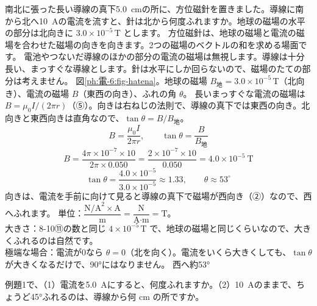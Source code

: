 \label{ph:電-6:ex1}
\begin{phreidai}
南北に張った長い導線の真下\qty{5.0}{cm}の所に、方位磁針を置きました。導線に南から北へ\qty{10}{A}の電流を流すと、針は北から何度ふれますか。地球の磁場の水平の部分は北向きに $3.0\times10^{-5}$\,T とします。
\phbamen
方位磁針は、地球の磁場と電流の磁場を合わせた磁場の向きを向きます。2つの磁場のベクトルの和を求める場面です。
\phmushi
電池やつないだ導線のほかの部分の電流の磁場は無視します。導線は十分長い、まっすぐな導線とします。針は水平にしか回らないので、磁場のたての部分は考えません。
\phzu
図\ref{ph:電-6:fig-hatena}。地球の磁場 $B_{\text{地}}=3.0\times10^{-5}$\,T（北向き）、電流の磁場 $B$（東西の向き）、ふれの角 $\theta$。
\phriyu
長いまっすぐな電流の磁場は $B=\mu_0I/(2\pi r)$（⑤）。向きは右ねじの法則で、導線の真下では東西の向き。北向きと東西向きは直角なので、$\tan\theta=B/B_{\text{地}}$。
\phtateru
\[B=\frac{\mu_0I}{2\pi r},\qquad\tan\theta=\frac{B}{B_{\text{地}}}\]
\phtoku
\[B=\frac{4\pi\times10^{-7}\times10}{2\pi\times0.050}=\frac{2\times10^{-7}\times10}{0.050}=4.0\times10^{-5}\ \text{T}\]
\[\tan\theta=\frac{4.0\times10^{-5}}{3.0\times10^{-5}}\approx1.33,\qquad\theta\approx53^\circ\]
向きは、電流を手前に向けて見ると導線の真下で磁場が西向き（②）なので、西へふれます。
\phtashikame
単位：$\dfrac{\text{N/A}^2\times\text{A}}{\text{m}}=\dfrac{\text{N}}{\text{A·m}}=\text{T}$。\\
大きさ：8-10⑪の数と同じ $4\times10^{-5}$\,T で、地球の磁場と同じくらいなので、大きくふれるのは自然です。\\
極端な場合：電流が0なら $\theta=0$（北を向く）。電流をいくら大きくしても、$\tan\theta$ が大きくなるだけで、90°にはなりません。
\kotae 西へ約53°
\end{phreidai}
\begin{jibun}
例題1で、（1）電流を\qty{5.0}{A}にすると、何度ふれますか。（2）\qty{10}{A}のままで、ちょうど45°ふれるのは、導線から何 cm の所ですか。
\end{jibun}

